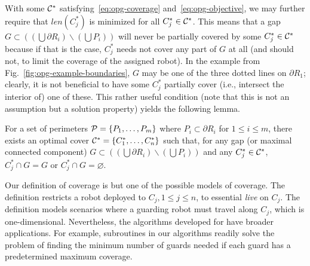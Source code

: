 With some $\C^*$ satisfying~\eqref{eq:opg-coverage} 
and~\eqref{eq:opg-objective}, we may further require that $len(C_j^*)$ is 
minimized for all $C_j^* \in \C^*$. This means that a gap $G \subset 
((\bigcup \partial R_i)\backslash (\bigcup P_i))$ will never be partially 
covered by some $C_j^* \in \C^*$ because if that is the case, $C_j^*$ 
needs not cover any part of $G$ at all (and should not, to limit the 
coverage of the assigned robot). In the example from 
Fig.~\ref{fig:opg-example-boundaries}, $G$ may be one of the three dotted 
lines on $\partial R_1$; clearly, it is not beneficial to have some 
$C_j^*$ partially cover (i.e., intersect the interior of) one of these. 
This rather useful condition (note that this is not an assumption but 
a solution property) yields the following lemma. 

\begin{lemma}\label{l:opg-no-partial-coverage} 
For a set of perimeters $\P = \{P_1,\ldots, P_m\}$ where $P_i \subset 
\partial R_i$ for $1 \le i \le m$, there exists an optimal cover $\C^* 
= \{C_1^*, \ldots, C_n^*\}$ such that, for any gap (or maximal connected
component) $G \subset ((\bigcup \partial R_i)\backslash (\bigcup P_i))$ 
and any $C_j^* \in \C^*$, $C_j^* \cap G = G$ or $C_j^* \cap G = 
\varnothing$. 
\end{lemma}

\begin{remark} Our definition of coverage is but one of the possible 
models of coverage. The definition restricts a robot deployed to 
$C_j, 1 \le j \le n$, to essential {\em live} on $C_j$. The definition 
models scenarios where a guarding robot must travel along $C_j$, which 
is one-dimensional. Nevertheless, the algorithms developed for \opg have 
broader applications. For example, subroutines in our algorithms readily 
solve the problem of finding the minimum number of guards needed if each 
guard has a predetermined maximum coverage. 
\end{remark}
